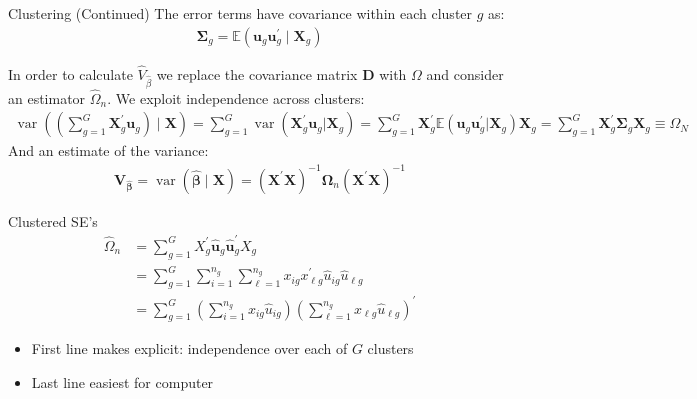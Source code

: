 \documentclass[aspectratio=169]{beamer}
\begin{document}
\begin{frame}{Clustering (Continued)}
The error terms have covariance within each cluster $g$ as:
\begin{align*}
 \boldsymbol{\Sigma}_ { g } = \mathbb { E } \left( \mathbf{u} _ { g }  \mathbf{ u } _ { g } ^ { \prime } \mid \boldsymbol { X } _ { g } \right)
\end{align*}

In order to calculate $\widehat{V}_{\widehat{\beta}}$ we replace the covariance matrix $\mathbf{D}$ with $\Omega$ and consider an estimator $\widehat{\Omega}_n$. We exploit \alert{independence across clusters}:
\begin{align*}
\operatorname { var } \left( \left( \sum _ { g = 1 } ^ { G } \boldsymbol { X } _ { g } ^ { \prime } \mathbf{u}_ { g } \right) \mid \boldsymbol { X } \right) = \sum _ { g = 1 } ^ { G } \operatorname { var } \left( \boldsymbol { X } _ { g } ^ { \prime } \boldsymbol { u } _ { g } | \boldsymbol { X } _ { g } \right)
= \sum _ { g = 1 } ^ { G } \boldsymbol { X } _ { g } ^ { \prime } \mathbb { E } \left( \boldsymbol { u } _ { g } \boldsymbol { u } _ { g } ^ { \prime } | \boldsymbol { X } _ { g } \right) \boldsymbol { X } _ { g }
= \sum _ { g = 1 } ^ { G } \boldsymbol { X } _ { g } ^ { \prime } \boldsymbol { \Sigma } _ { g } \mathbf { X } _ { g } 
 \equiv \Omega_N
\end{align*}
And an estimate of the variance:
\begin{align*}
\boldsymbol { V } _ { \widehat { \boldsymbol { \beta } } } = \operatorname { var } ( \widehat { \boldsymbol { \beta } } \mid  \boldsymbol { X } )
= \left( \mathbf { X } ^ { \prime } \mathbf { X } \right) ^ { - 1 } \boldsymbol { \Omega } _ { n } \left( \mathbf { X } ^ { \prime } \mathbf { X } \right) ^ { - 1 }
\end{align*}
\end{frame}


\begin{frame}{Clustered SE's}
\begin{align*}
\widehat { \Omega } _ { n } &= \sum _ { g = 1 } ^ { G } X _ { g } ^ { \prime } \widehat {\mathbf{ u }} _ { g }\widehat {\mathbf{ u }}_{g} ^ { \prime } X _ { g }\\
&= \sum _ { g = 1 } ^ { G } \sum _ { i = 1 } ^ { n _ { g } } \sum _ { \ell = 1 } ^ { n _ { g } } x _ { i g } x _ { \ell g } ^ { \prime } \widehat { u } _ { i g } \widehat { u } _ { \ell g }\\
&= \sum _ { g = 1 } ^ { G } \left( \sum _ { i = 1 } ^ { n _ { g } } x _ { i g } \widehat { u } _ { i g } \right) \left( \sum _ { \ell = 1 } ^ { n _ { g } } x _ { \ell g } \widehat { u } _ { \ell g } \right) ^ { \prime }
\end{align*}
\begin{itemize}
\item First line makes explicit: independence over each of $G$ clusters
\item Last line easiest for computer
\end{itemize}
\end{frame}
\end{document}
